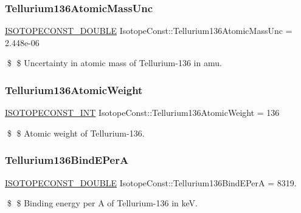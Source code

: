 \subsubsection{\texorpdfstring{Tellurium136\+Atomic\+Mass\+Unc}{Tellurium136AtomicMassUnc}}
{\footnotesize\ttfamily \mbox{\hyperlink{group___isotope_const-_macros_ga8f45a7272ce02c0b4c65c44636ed719a}{I\+S\+O\+T\+O\+P\+E\+C\+O\+N\+S\+T\+\_\+\+D\+O\+U\+B\+LE}} Isotope\+Const\+::\+Tellurium136\+Atomic\+Mass\+Unc = 2.\+448e-\/06}

\$ \$ Uncertainty in atomic mass of Tellurium-\/136 in amu. \mbox{\label{group___isotope_const-_tellurium-_te136_ga75347c59cf10705ada50d5fb8f3d7e2b}} 
\subsubsection{\texorpdfstring{Tellurium136\+Atomic\+Weight}{Tellurium136AtomicWeight}}
{\footnotesize\ttfamily \mbox{\hyperlink{group___isotope_const-_macros_ga5f18360b3e99483a35c32d789e62621c}{I\+S\+O\+T\+O\+P\+E\+C\+O\+N\+S\+T\+\_\+\+I\+NT}} Isotope\+Const\+::\+Tellurium136\+Atomic\+Weight = 136}

\$ \$ Atomic weight of Tellurium-\/136. \mbox{\label{group___isotope_const-_tellurium-_te136_ga7531ace8caadb38294c3a61a236b8f08}} 
\subsubsection{\texorpdfstring{Tellurium136\+Bind\+E\+PerA}{Tellurium136BindEPerA}}
{\footnotesize\ttfamily \mbox{\hyperlink{group___isotope_const-_macros_ga8f45a7272ce02c0b4c65c44636ed719a}{I\+S\+O\+T\+O\+P\+E\+C\+O\+N\+S\+T\+\_\+\+D\+O\+U\+B\+LE}} Isotope\+Const\+::\+Tellurium136\+Bind\+E\+PerA = 8319.}

\$ \$ Binding energy per A of Tellurium-\/136 in keV. \mbox{\label{group___isotope_const-_tellurium-_te136_gae00f8863c3607adc90550a215bdc71f1}} 
